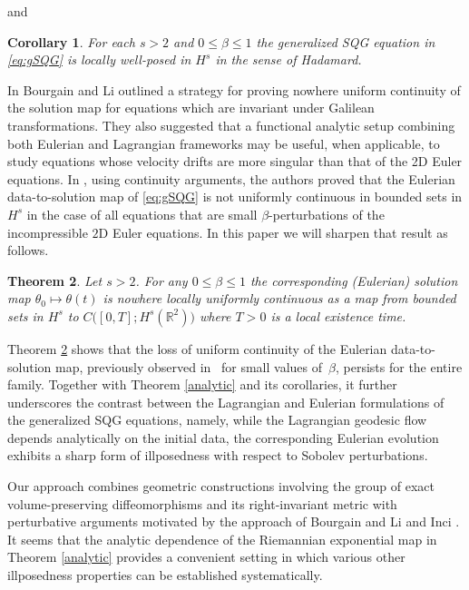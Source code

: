 \documentclass[11pt]{amsart}
\newtheorem{theorem}{Theorem}%
\newtheorem{corollary}[theorem]{Corollary}
\numberwithin{equation}{section}
\begin{document}
%
and
%
\begin{corollary} \label{lwp} 
For each $s > 2$ and $0\le\beta\le 1$ 
the generalized SQG equation in \eqref{eq:gSQG} 
is locally well-posed in $H^s$ in the sense of Hadamard. 
\end{corollary}
% 
In \cite{BL} Bourgain and Li outlined a strategy for proving nowhere uniform continuity of the solution map for equations which are invariant under Galilean transformations. They also suggested that a functional analytic setup combining both Eulerian and Lagrangian frameworks may be useful, when applicable, 
to study equations whose velocity drifts are more singular than that of the 2D Euler equations.  
In \cite{MV2023}, using continuity arguments, 
the authors proved that 
the Eulerian data-to-solution map of \eqref{eq:gSQG} 
is not uniformly continuous in bounded sets in $H^s$ 
in the case of all equations 
that are small $\beta$-perturbations of the incompressible $2$D Euler equations. 
In this paper we will sharpen that result as follows. 
% 
\begin{theorem}\label{nonuniform} 
Let $s>2$. For any $0\le \beta\le 1$ 
the corresponding (Eulerian) solution map 
$\theta_0 \mapsto \theta (t)$ 
is nowhere locally uniformly continuous 
as a map from bounded sets in $H^s$ 
to $ C\big([0,T];H^s(\mathbb  R^2)\big)$ 
where $T>0$ is a local existence time. 
\end{theorem} 
% 
Theorem \ref{nonuniform} shows that the loss of uniform continuity of the Eulerian data-to-solution map, previously observed 
in~\cite{MV2023} for small values of~$\beta$, 
persists for the entire family. 
Together with Theorem \ref{analytic} and its corollaries, 
it further underscores the contrast between 
the Lagrangian and Eulerian formulations of 
the generalized SQG equations, namely, 
while the Lagrangian geodesic flow depends analytically on the initial data, 
the corresponding Eulerian evolution exhibits 
a sharp form of illposedness with respect to Sobolev perturbations. 

Our approach combines geometric constructions 
involving the group of exact volume-preserving diffeomorphisms and its right-invariant metric 
with perturbative arguments motivated by the approach of Bourgain and Li \cite{BL,BL2015} and 
Inci \cite{inci2015regularity}. 
It seems that the analytic dependence of 
the Riemannian exponential map in Theorem \ref{analytic} 
provides a convenient setting in which various other 
illposedness properties can be established systematically. 
\end{document}
